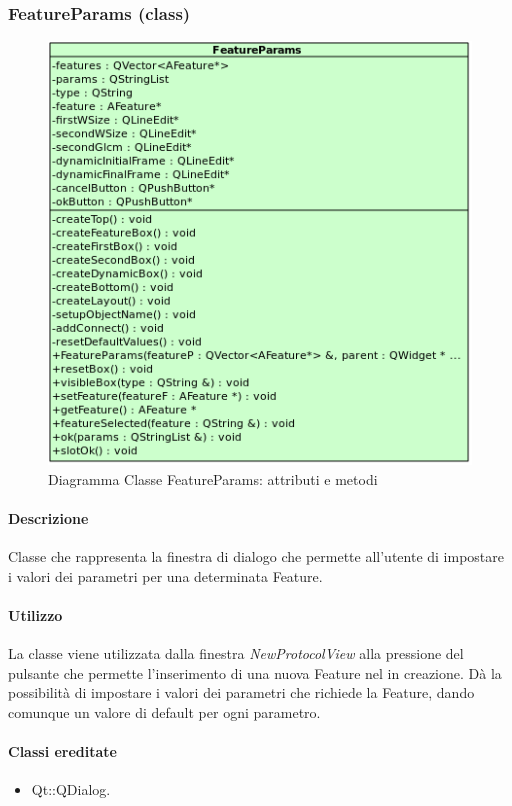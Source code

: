 \subsubsection{FeatureParams (class)}
\label{speFeaPar}
\begin{figure}[!h]
\centering
			\includegraphics[width=0.8\linewidth] {./Content/Immagini/view/FeatureParams.png}
			\caption{Diagramma Classe FeatureParams: attributi e metodi}
			\label{cl_fea}
\end{figure}
\paragraph{Descrizione \\}
Classe che rappresenta la finestra di dialogo che permette all'utente di impostare i valori dei parametri per una determinata Feature\g{}.
\paragraph{Utilizzo\\}
La classe viene utilizzata dalla finestra \emph{NewProtocolView} alla pressione del pulsante che permette l'inserimento di una nuova Feature\g{} nel \protocol in creazione. Dà la possibilità di impostare i valori dei parametri che richiede la Feature\g{}, dando comunque un valore di default per ogni parametro.
\paragraph{Classi ereditate\\}
\begin{itemize}
\item Qt::QDialog.
\end{itemize}

